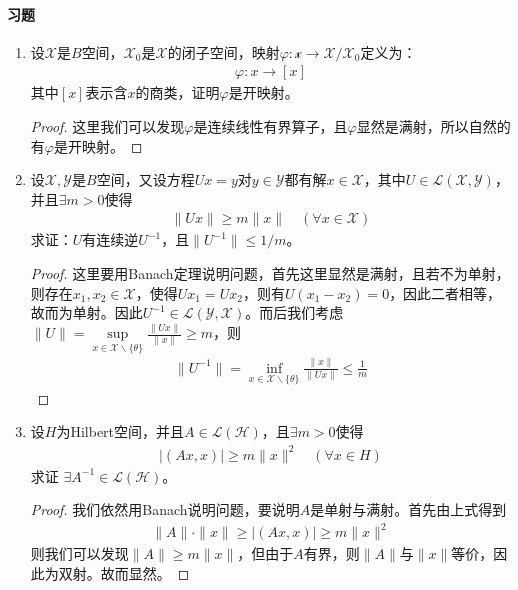 \paragraph{习题}
\begin{enumerate}[leftmargin=2cm, label=\arabic*]
    \item 设$\mathscr{X}$是$B$空间，$\mathscr{X}_0$是$\mathscr{X}$的闭子空间，映射$\varphi:\mathscr{x}\to\mathscr{X}/\mathscr{X}_0$定义为：
    \begin{align*}
        \varphi: x\to [x]
    \end{align*}
    其中$[x]$表示含$x$的商类，证明$\varphi$是开映射。
    \begin{proof}
        这里我们可以发现$\varphi$是连续线性有界算子，且$\varphi$显然是满射，所以自然的有$\varphi$是开映射。
    \end{proof}

    \item 设$\mathscr{X},\mathscr{Y}$是$B$空间，又设方程$Ux = y$对$y\in\mathscr{Y}$都有解$x\in\mathscr{X}$，其中$U\in\mathscr{L}(\mathscr{X},\mathscr{Y})$，并且$\exists m>0$使得
    \begin{align*}
        \|Ux\| \geqslant m\|x\| \quad (\forall x\in\mathscr{X})
    \end{align*}
    求证：$U$有连续逆$U^{-1}$，且$\|U^{-1}\|\leqslant 1/m$。
    \begin{proof}
        这里要用Banach定理说明问题，首先这里显然是满射，且若不为单射，则存在$x_1,x_2\in\mathscr{X}$，使得$Ux_1 = Ux_2$，则有$U(x_1 - x_2)= 0$，因此二者相等，故而为单射。因此$U^{-1}\in\mathscr{L}(\mathscr{Y},\mathscr{X})$。而后我们考虑$\|U\| = \sup\limits_{x\in\mathscr{X}\backslash\{\theta\}}\frac{\|Ux\|}{\|x\|}\geqslant m$，则
        \begin{align*}
            \|U^{-1}\| = \inf\limits_{x\in\mathscr{X}\backslash\{\theta\}} \frac{\|x\|}{\|Ux\|} \leqslant \frac{1}{m}
         \end{align*}
    \end{proof}

    \item 设$H$为Hilbert空间，并且$A\in\mathscr{L}(\mathscr{H})$，且$\exists m>0$使得
    \begin{align*}
        |(Ax,x)| \geqslant m\|x\|^2 \quad (\forall x\in H)
    \end{align*}
    求证 $\exists A^{-1}\in\mathscr{L}(\mathscr{H})$。
    \begin{proof}
        我们依然用Banach说明问题，要说明$A$是单射与满射。首先由上式得到
        \begin{align*}
            \|A\| \cdot \|x\| \geqslant |(Ax,x)| \geqslant m\|x\|^2
        \end{align*}
        则我们可以发现$\|A\| \geqslant m\|x\|$，但由于$A$有界，则$\|A\|$与$\|x\|$等价，因此为双射。故而显然。
    \end{proof}


\end{enumerate}
